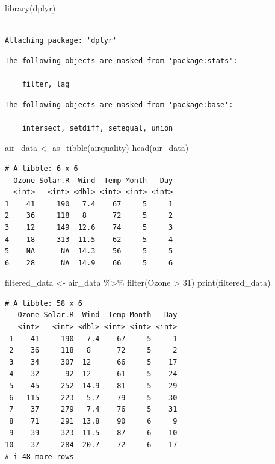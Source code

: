 \documentclass[
  letterpaper,
  DIV=11,
  numbers=noendperiod]{scrreprt}
\newenvironment{Shaded}{\begin{snugshade}}{\end{snugshade}}
\newcommand{\DecValTok}[1]{\textcolor[rgb]{0.68,0.00,0.00}{#1}}
\newcommand{\FunctionTok}[1]{\textcolor[rgb]{0.28,0.35,0.67}{#1}}
\newcommand{\NormalTok}[1]{\textcolor[rgb]{0.00,0.23,0.31}{#1}}
\newcommand{\OtherTok}[1]{\textcolor[rgb]{0.00,0.23,0.31}{#1}}
\newcommand{\SpecialCharTok}[1]{\textcolor[rgb]{0.37,0.37,0.37}{#1}}
\begin{document}
\begin{Shaded}
\begin{Highlighting}[]
\FunctionTok{library}\NormalTok{(dplyr)}
\end{Highlighting}
\end{Shaded}

\begin{verbatim}

Attaching package: 'dplyr'
\end{verbatim}

\begin{verbatim}
The following objects are masked from 'package:stats':

    filter, lag
\end{verbatim}

\begin{verbatim}
The following objects are masked from 'package:base':

    intersect, setdiff, setequal, union
\end{verbatim}

\begin{Shaded}
\begin{Highlighting}[]
\NormalTok{air\_data }\OtherTok{\textless{}{-}} \FunctionTok{as\_tibble}\NormalTok{(airquality)}
\FunctionTok{head}\NormalTok{(air\_data)}
\end{Highlighting}
\end{Shaded}

\begin{verbatim}
# A tibble: 6 x 6
  Ozone Solar.R  Wind  Temp Month   Day
  <int>   <int> <dbl> <int> <int> <int>
1    41     190   7.4    67     5     1
2    36     118   8      72     5     2
3    12     149  12.6    74     5     3
4    18     313  11.5    62     5     4
5    NA      NA  14.3    56     5     5
6    28      NA  14.9    66     5     6
\end{verbatim}

\begin{Shaded}
\begin{Highlighting}[]
\NormalTok{filtered\_data }\OtherTok{\textless{}{-}}\NormalTok{ air\_data }\SpecialCharTok{\%\textgreater{}\%} \FunctionTok{filter}\NormalTok{(Ozone }\SpecialCharTok{\textgreater{}} \DecValTok{31}\NormalTok{)}
\FunctionTok{print}\NormalTok{(filtered\_data)}
\end{Highlighting}
\end{Shaded}

\begin{verbatim}
# A tibble: 58 x 6
   Ozone Solar.R  Wind  Temp Month   Day
   <int>   <int> <dbl> <int> <int> <int>
 1    41     190   7.4    67     5     1
 2    36     118   8      72     5     2
 3    34     307  12      66     5    17
 4    32      92  12      61     5    24
 5    45     252  14.9    81     5    29
 6   115     223   5.7    79     5    30
 7    37     279   7.4    76     5    31
 8    71     291  13.8    90     6     9
 9    39     323  11.5    87     6    10
10    37     284  20.7    72     6    17
# i 48 more rows
\end{verbatim}
\end{document}
